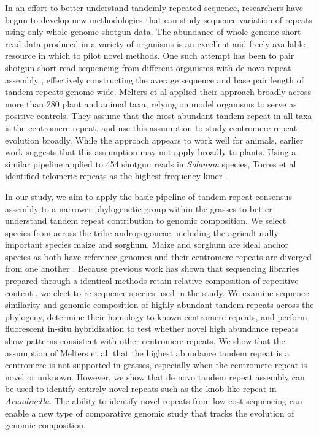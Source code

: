 \documentclass[10pt,letterpaper]{article}
\newcommand{\jri}[1]{\todo[size=\scriptsize, color=SkyBlue]{#1}}
\newcommand{\pb}[1]{\todo[size=\scriptsize, color=Bittersweet]{#1}} %
\begin{document}
In an effort to better understand tandemly repeated sequence, researchers have begun to develop new methodologies that can study sequence variation of repeats using only whole genome shotgun data.
The abundance of whole genome short read data produced in a variety of organisms is an excellent and freely available resource in which to pilot novel methods.
One such attempt has been to pair shotgun short read sequencing from different organisms with de novo repeat assembly \cite{melters2013comparative}, effectively constructing the average sequence and base pair length of tandem repeats genome wide.
Melters et al \cite{melters2013comparative} applied their approach broadly across more than 280 plant and animal taxa, relying on model organisms to serve as positive controls.
They assume that the most abundant tandem repeat in all taxa is the centromere repeat, and use this assumption to study centromere repeat evolution broadly.
While the approach appears to work well for animals, earlier work suggests that this assumption may not apply broadly to plants.
Using a similar pipeline applied to 454 shotgun reads in \emph{Solanum} species, Torres et al identified telomeric repeats as the highest frequency kmer \cite{torres2011organization}.

In our study, we aim to apply the basic pipeline of tandem repeat consensus assembly to a narrower phylogenetic group within the grasses to better understand tandem repeat contribution to genomic composition.
We select species from across the tribe andropogoneae, including the agriculturally important species maize and sorghum.
Maize and sorghum are ideal anchor species as both have reference genomes and their centromere repeats are diverged from one another \cite{paterson2009sorghum,Schnable2009}.
Because previous work has shown that sequencing libraries prepared through a identical methods retain relative composition of repetitive content \cite{bilinski2014diversity},%
 we elect to re-sequence species used in the study.
We examine sequence similarity and genomic composition of highly abundant tandem repeats across the phylogeny, determine their homology to known centromere repeats, and perform fluorescent in-situ hybridization to test whether novel high abundance repeats show patterns consistent with other centromere repeats.
We show that the assumption of Melters et al. \cite{melters2013comparative} that the highest abundance tandem repeat is a centromere is not supported in grasses, especially when the centromere repeat is novel or unknown.
However, we show that de novo tandem repeat assembly can be used to identify entirely novel repeats such as the knob-like repeat in \emph{Arundinella}.
The ability to identify novel repeats from low cost sequencing can enable a new type of comparative genomic study that tracks the evolution of genomic composition.%
\end{document}
